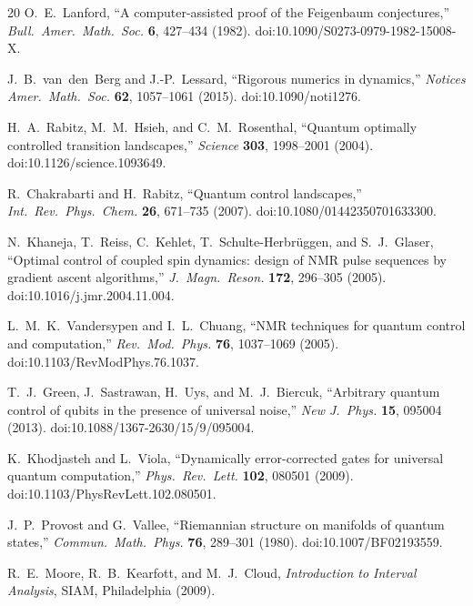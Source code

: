 \begin{thebibliography}{20}
O.~E.~Lanford, ``A computer-assisted proof of the Feigenbaum conjectures,''
\emph{Bull.~Amer.~Math.~Soc.} \textbf{6}, 427--434 (1982).
doi:10.1090/S0273-0979-1982-15008-X.

J.~B.~van~den~Berg and J.-P.~Lessard, ``Rigorous numerics in dynamics,''
\emph{Notices Amer.~Math.~Soc.} \textbf{62}, 1057--1061 (2015). doi:10.1090/noti1276.

H.~A.~Rabitz, M.~M.~Hsieh, and C.~M.~Rosenthal, ``Quantum optimally controlled transition
landscapes,'' \emph{Science} \textbf{303}, 1998--2001 (2004). doi:10.1126/science.1093649.

R.~Chakrabarti and H.~Rabitz, ``Quantum control landscapes,'' \emph{Int.~Rev.~Phys.~Chem.}
\textbf{26}, 671--735 (2007). doi:10.1080/01442350701633300.

N.~Khaneja, T.~Reiss, C.~Kehlet, T.~Schulte-Herbr\"uggen, and S.~J.~Glaser, ``Optimal
control of coupled spin dynamics: design of NMR pulse sequences by gradient ascent
algorithms,'' \emph{J.~Magn.~Reson.} \textbf{172}, 296--305 (2005).
doi:10.1016/j.jmr.2004.11.004.

L.~M.~K.~Vandersypen and I.~L.~Chuang, ``NMR techniques for quantum control and
computation,'' \emph{Rev.~Mod.~Phys.} \textbf{76}, 1037--1069 (2005).
doi:10.1103/RevModPhys.76.1037.

T.~J.~Green, J.~Sastrawan, H.~Uys, and M.~J.~Biercuk, ``Arbitrary quantum control of
qubits in the presence of universal noise,'' \emph{New J.~Phys.} \textbf{15}, 095004
(2013). doi:10.1088/1367-2630/15/9/095004.

K.~Khodjasteh and L.~Viola, ``Dynamically error-corrected gates for universal quantum
computation,'' \emph{Phys.~Rev.~Lett.} \textbf{102}, 080501 (2009).
doi:10.1103/PhysRevLett.102.080501.

J.~P.~Provost and G.~Vallee, ``Riemannian structure on manifolds of quantum states,''
\emph{Commun.~Math.~Phys.} \textbf{76}, 289--301 (1980). doi:10.1007/BF02193559.

R.~E.~Moore, R.~B.~Kearfott, and M.~J.~Cloud, \emph{Introduction to Interval Analysis},
SIAM, Philadelphia (2009).

\end{thebibliography}
